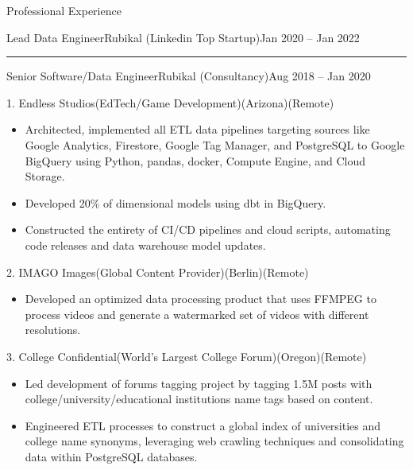 \documentclass[]{ahmedamrcv}
\begin{document}
\begin{cvsection}{Professional Experience}
\begin{cvsubsection}{Lead Data Engineer}{Rubikal (Linkedin Top Startup)}{Jan 2020 -- Jan 2022}
            \end{cvsubsection}

            \centering\rule{300pt}{0.4pt}
            
            \begin{cvsubsection}{Senior Software/Data Engineer}{Rubikal (Consultancy)}{Aug 2018 -- Jan 2020}

            \begin{cvsubsection}{1. Endless Studios}{(EdTech/Game Development)}{(Arizona)(Remote)}	
			\begin{itemize}
				\item Architected, implemented all ETL data pipelines targeting sources like Google Analytics, Firestore, Google Tag Manager, and PostgreSQL to Google BigQuery using Python, pandas, docker, Compute Engine, and Cloud Storage.
				\item Developed 20\% of dimensional models using dbt in BigQuery.
				\item Constructed the entirety of CI/CD pipelines and cloud scripts, automating code releases and data warehouse model updates.
			\end{itemize}
		\end{cvsubsection}

		\begin{cvsubsection}{2. IMAGO Images}{(Global Content Provider)}{(Berlin)(Remote)}	
			\begin{itemize}
				\item Developed an optimized data processing product that uses FFMPEG to process videos and generate a watermarked set of videos with different resolutions.
			\end{itemize}
		\end{cvsubsection}

		\begin{cvsubsection}{3. College Confidential}{(World's Largest College Forum)}{(Oregon)(Remote)}	
			\begin{itemize}
				\item Led development of forums tagging project by tagging 1.5M posts with college/university/educational institutions name tags based on content.
                    \item Engineered ETL processes to construct a global index of universities and college name synonyms, leveraging web crawling techniques and consolidating data within PostgreSQL databases.
			\end{itemize}
		\end{cvsubsection}


\end{cvsubsection}
\end{cvsection}
\end{document}
